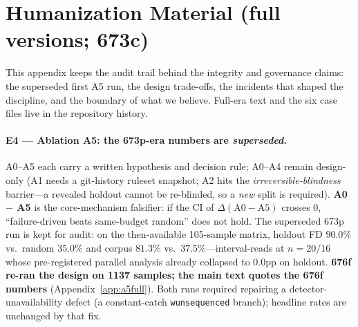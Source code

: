 
\section{Humanization Material (full versions; 673c)}
\label{app:humanize}
This appendix keeps the audit trail behind the integrity and governance claims: the superseded
first A5 run, the design trade-offs, the incidents that shaped the discipline, and the boundary of
what we believe. Full-era text and the six case files live in the repository history.

\paragraph{E4 --- Ablation A5: the 673p-era numbers are \emph{superseded}.}
A0--A5 each carry a written hypothesis and decision rule; A0--A4 remain design-only (A1 needs a
git-history ruleset snapshot; A2 hits the \emph{irreversible-blindness} barrier---a revealed holdout
cannot be re-blinded, so a \emph{new} split is required). \textbf{A0 $-$ A5} is the core-mechanism
falsifier: if the CI of $\Delta(\text{A0}-\text{A5})$ crosses 0, ``failure-driven beats same-budget
random'' does not hold. The superseded 673p run is kept for audit: on the then-available 105-sample
matrix, holdout FD $90.0\%$ vs.\ random $35.0\%$ and corpus $81.3\%$ vs.\ $37.5\%$---interval-reads
at $n{=}20/16$ whose pre-registered parallel analysis already collapsed to $0.0$pp on holdout.
\textbf{676f re-ran the design on 1137 samples; the main text quotes the 676f numbers}
(Appendix~\ref{app:a5full}). Both runs required repairing a detector-unavailability defect (a
constant-catch \texttt{wunsequenced} branch); headline rates are unchanged by that fix.

